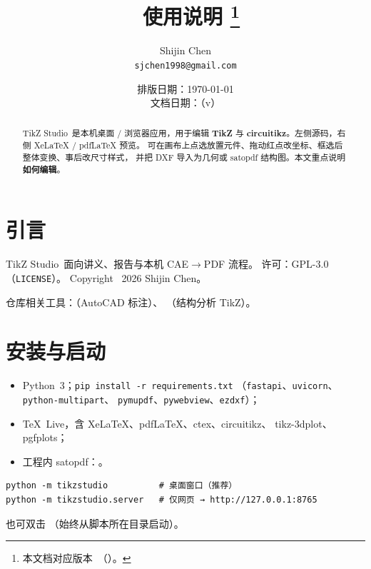 \documentclass[a4paper]{ltxdoc}
\title{%
  \appname\ 使用说明%
  \thanks{本文档对应版本~\fileversion{}（\filedate）。}%
}
\author{%
  Shijin Chen\\
  \texttt{sjchen1998@gmail.com}%
}
\date{排版日期：\today\\[0.5em] 文档日期：\filedate{}（v\fileversion）}
\newcommand{\appname}{\textsf{TikZ Studio}}
\begin{document}
\maketitle

\begin{abstract}
\appname\ 是本机桌面 / 浏览器应用，用于编辑 \textbf{TikZ} 与
\textbf{circuitikz}。左侧源码，右侧 XeLaTeX / pdfLaTeX 预览。
可在画布上点选放置元件、拖动红点改坐标、框选后整体变换、事后改尺寸样式，
并把 DXF 导入为几何或 \textsf{satopdf} 结构图。本文重点说明\textbf{如何编辑}。
\end{abstract}

\tableofcontents
\clearpage

\section{引言}

\appname\ 面向讲义、报告与本机 CAE$\rightarrow$PDF 流程。
许可：GPL-3.0（\texttt{LICENSE}）。
Copyright \textcopyright\ 2026 Shijin Chen。

仓库相关工具：（AutoCAD 标注）、
（结构分析 TikZ）。

\section{安装与启动}

\begin{itemize}[nosep]
  \item Python~3；\texttt{pip install -r requirements.txt}
        （\texttt{fastapi}、\texttt{uvicorn}、\texttt{python-multipart}、
        \texttt{pymupdf}、\texttt{pywebview}、\texttt{ezdxf}）；
  \item TeX~Live，含 XeLaTeX、pdfLaTeX、\textsf{ctex}、\textsf{circuitikz}、
        \textsf{tikz-3dplot}、\textsf{pgfplots}；
  \item 工程内 \textsf{satopdf}：。
\end{itemize}

\begin{verbatim}
python -m tikzstudio          # 桌面窗口（推荐）
python -m tikzstudio.server   # 仅网页 → http://127.0.0.1:8765
\end{verbatim}
也可双击 （始终从脚本所在目录启动）。
\end{document}
